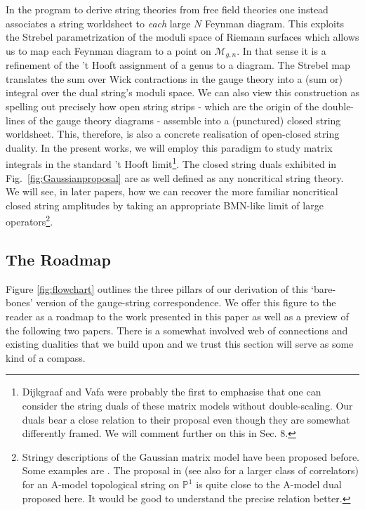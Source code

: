 \documentclass[english]{article}
\let\mc=\mathcal
\begin{document}
In the program \cite{freefieldsadsI,freefieldsadsII,freefieldsIII} to derive string theories from free field theories one instead associates a string worldsheet to {\it each} large $N$ Feynman diagram.  This exploits the Strebel parametrization of the moduli space of Riemann surfaces which allows us to map each Feynman diagram to a point on $\mc{M}_{g,n}$. In that sense it is a refinement of the 't Hooft assignment of a genus to a diagram. The Strebel map translates the sum over Wick contractions in the gauge theory into a (sum or) integral over the dual string's moduli space. We can also view this construction as spelling out precisely how open string strips - which are the origin of the double-lines of the gauge theory diagrams - assemble into a (punctured) closed string worldsheet. This, therefore, is also a concrete realisation of open-closed string duality. In the present works, we will employ this paradigm to study matrix integrals in the standard 't Hooft limit\footnote{Dijkgraaf and Vafa \cite{DijkgraafVafa02, Aganagic_2005} were probably the first to emphasise that one can consider the string duals of these matrix models without double-scaling. Our duals bear a close relation to their proposal even though they are somewhat differently framed. We will comment further on this in Sec. 8.}. The closed string duals exhibited in Fig.~\ref{fig:Gaussianproposal} are as well defined as any noncritical string theory. We will see, in later papers,  how we can recover the more familiar noncritical closed string amplitudes by taking an appropriate BMN-like limit of large operators\footnote{Stringy descriptions of the Gaussian matrix model have been proposed before. Some examples are \cite{razamatGauss, razamat2010matrices, itzhaki2005large, berenstein2004toy, gopakumar2011simplest, gopakumar2013correlators}. The proposal in \cite{gopakumar2011simplest,gopakumar2013correlators} (see also \cite{deMelloKoch:2014khl} for a larger class of correlators) for an A-model topological string on $\mathbb{P}^1$ is quite close to the A-model dual proposed here. It would be good to understand the precise relation better.}.   

\subsection{The Roadmap}

Figure \ref{fig:flowchart} outlines the three pillars of our derivation of this `bare-bones' version of the gauge-string correspondence. 
We offer this figure to the reader as a roadmap to the work presented in this paper as well as a preview of the following two papers. There is a somewhat involved web of connections and existing dualities that we build upon and we trust this section will serve as some kind of a compass.
\end{document}
